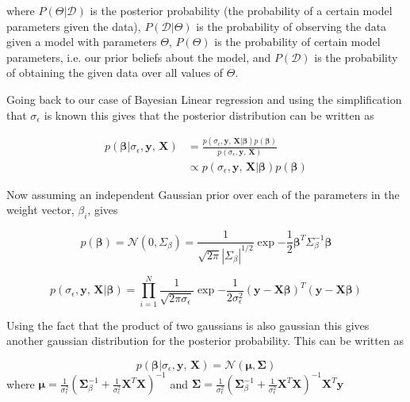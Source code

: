 \documentclass{article}
\begin{document}
\begin{enumerate}
	where $P(\Theta | \mathcal{D})$ is the posterior probability (the probability of a certain model parameters given the data),  $P(\mathcal{D} | \Theta)$ is the probability of observing the data given a model with parameters $\Theta$, $P(\Theta)$ is the probability of certain model parameters, i.e. our prior beliefs about the model, and $P(\mathcal{D})$ is the probability of obtaining the given data over all values of $\Theta$.
	
	Going back to our case of Bayesian Linear regression and using the simplification that $\sigma_\epsilon$ is known this gives that the posterior distribution can be written as 
	
	\begin{equation}
	\begin{split}
		p(\boldsymbol{\beta}|\sigma_\epsilon, \textbf{y, X}) &= \frac{p(\sigma_\epsilon, \textbf{y, X}|\boldsymbol{\beta}) p(\boldsymbol{\beta})}{p(\sigma_\epsilon, \textbf{y, X})}\\
		&\propto p(\sigma_\epsilon, \textbf{y, X}|\boldsymbol{\beta}) p(\boldsymbol{\beta})
	\end{split}
	\end{equation}
	
	Now assuming an independent Gaussian prior over each of the parameters in the weight vector, $\beta_i$, gives
	
	\begin{equation}
		p(\boldsymbol{\beta} ) = \mathcal{N}(0,\Sigma_\beta) = \frac{1}{\sqrt{2\pi} |\Sigma_\beta|^{1/2} } \exp{-\frac{1}{2}\boldsymbol{\beta}^T\Sigma_\beta^{-1}\boldsymbol{\beta} }
	\end{equation}
	
	\begin{equation}
		p(\sigma_\epsilon, \textbf{y, X}|\boldsymbol{\beta}) 
		= \prod_{i=1}^N \frac{1}{\sqrt{2\pi\sigma_\epsilon} } \exp{ -\frac{1}{2\sigma_\epsilon^2}(\textbf{y} - \textbf{X}\boldsymbol{\beta})^T (\textbf{y} - \textbf{X}\boldsymbol{\beta})}
	\end{equation}
	
	Using the fact that the product of two gaussians is also gaussian this gives another gaussian distribution for the posterior probability. This can be written as 
	
	\begin{equation}
		p(\boldsymbol{\beta}|\sigma_\epsilon, \textbf{y, X}) =
		\mathcal{N}( \boldsymbol{\mu}, \boldsymbol{\Sigma })
	\end{equation}
	where $\boldsymbol{\mu} = \frac{1}{\sigma_\epsilon^2} (\boldsymbol{\Sigma}_\beta^{-1} + \frac{1}{\sigma_\epsilon^2} \textbf{X}^T\textbf{X} )^{-1} $ and $\boldsymbol{\Sigma } = \frac{1}{\sigma_\epsilon^2} (\boldsymbol{\Sigma}_\beta^{-1} + \frac{1}{\sigma_\epsilon^2} \textbf{X}^T\textbf{X} )^{-1} \textbf{X}^T \textbf{y}$
	

\end{enumerate}
\end{document}
